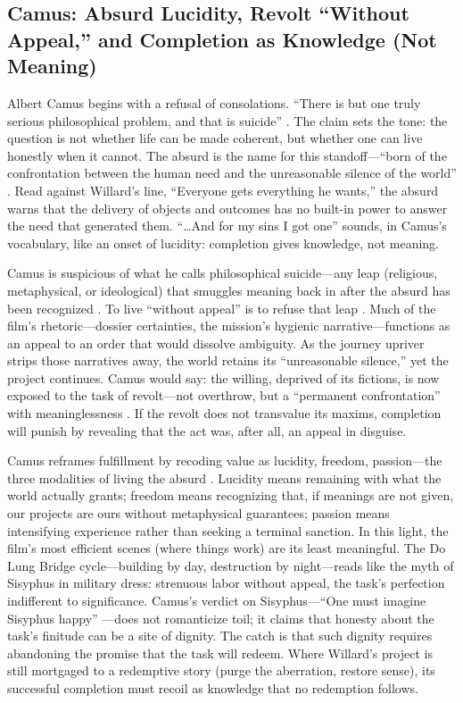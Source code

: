 \subsection*{Camus: Absurd Lucidity, Revolt ``Without Appeal,'' and Completion as Knowledge
	(Not Meaning)}
\label{ssec:iii-camus}
Albert Camus begins with a refusal of consolations. ``There is but one truly serious philosophical
problem, and that is suicide'' \parencite[p.~3]{CamusMyth1991}. The claim sets the tone: the
question is not whether life can be made coherent, but whether one can live honestly when it
cannot. The absurd is the name for this standoff—``born of the confrontation between the human
need and the unreasonable silence of the world'' \parencite[p.~28]{CamusMyth1991}. Read against
Willard's line, ``Everyone gets everything he wants,'' the absurd warns that the delivery of
objects and outcomes has no built-in power to answer the need that generated them. ``\ldots And
for my sins I got one'' sounds, in Camus's vocabulary, like an onset of lucidity: completion
gives knowledge, not meaning.

Camus is suspicious of what he calls philosophical suicide—any leap (religious, metaphysical,
or ideological) that smuggles meaning back in after the absurd has been recognized
\parencite[pp.~53--58]{CamusMyth1991}. To live ``without appeal'' is to refuse that leap
\parencite[p.~54]{CamusMyth1991}. Much of the film's rhetoric—dossier certainties, the mission's
hygienic narrative—functions as an appeal to an order that would dissolve ambiguity. As the
journey upriver strips those narratives away, the world retains its ``unreasonable silence,''
yet the project continues. Camus would say: the willing, deprived of its fictions, is now
exposed to the task of revolt—not overthrow, but a ``permanent confrontation'' with
meaninglessness \parencite[p.~55]{CamusMyth1991}. If the revolt does not transvalue its maxims,
completion will punish by revealing that the act was, after all, an appeal in disguise.

Camus reframes fulfillment by recoding value as lucidity, freedom, passion—the three modalities
of living the absurd \parencite[pp.~54--71]{CamusMyth1991}. Lucidity means remaining with what
the world actually grants; freedom means recognizing that, if meanings are not given, our
projects are ours without metaphysical guarantees; passion means intensifying experience rather
than seeking a terminal sanction. In this light, the film's most efficient scenes (where things
work) are its least meaningful. The Do Lung Bridge cycle—building by day, destruction by
night—reads like the myth of Sisyphus in military dress: strenuous labor without appeal, the
task's perfection indifferent to significance. Camus's verdict on Sisyphus—``One must imagine
Sisyphus happy'' \parencite[p.~123]{CamusMyth1991}—does not romanticize toil; it claims that
honesty about the task's finitude can be a site of dignity. The catch is that such dignity
requires abandoning the promise that the task will redeem. Where Willard's project is still
mortgaged to a redemptive story (purge the aberration, restore sense), its successful completion
must recoil as knowledge that no redemption follows.

